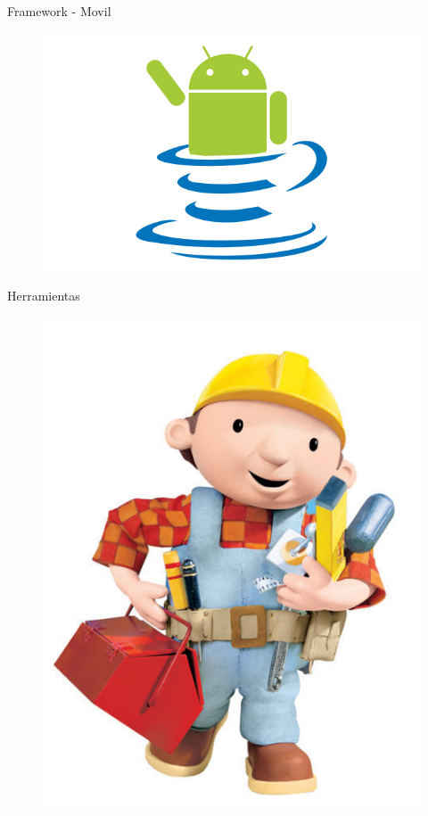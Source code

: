 \documentclass{beamer}
\begin{document}
\begin{frame}{Framework - Movil}
	\begin{figure}
		\centering
		\includegraphics[width=0.9\linewidth]{Images/android}
	\end{figure}
\end{frame}



\begin{frame}{Herramientas}
	\begin{figure}
		\centering
		\includegraphics[width=0.5\linewidth]{Images/bob}
	\end{figure}
\end{frame}
\end{document}
